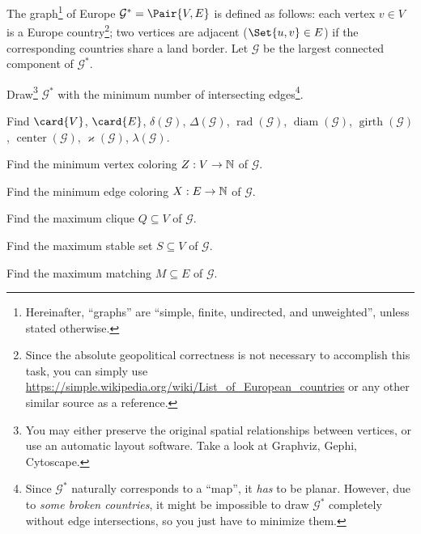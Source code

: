\documentclass[a4paper,12pt]{article}
\newcommand{\MyGraph}{\mathcal{G}}
\newcommand{\MyGraphFull}{\MyGraph^{*}}
\newcommand{\op}[1]{\operatorname*{#1}}
\newcommand{\minDegree}[1]{\delta(#1)}
\newcommand{\maxDegree}[1]{\Delta(#1)}
\newcommand{\graphRadius}[1]{\op{rad}(#1)}
\newcommand{\graphDiameter}[1]{\op{diam}(#1)}
\newcommand{\graphGirth}[1]{\op{girth}(#1)}
\newcommand{\graphCenter}[1]{\op{center}(#1)}
\newcommand{\vertexConnectivity}[1]{\varkappa(#1)}
\newcommand{\edgeConnectivity}[1]{\lambda(#1)}
\begin{document}

\begin{tasks}
    \item The graph\footnote{Hereinafter, \enquote{graphs} are \enquote{simple, finite, undirected, and unweighted}, unless stated otherwise.} of Europe $\MyGraphFull = \Pair{V, E}$ is defined as follows: each vertex $v \in V$ is a Europe country\footnote{Since the absolute geopolitical correctness is not necessary to accomplish this task, you can simply use \url{https://simple.wikipedia.org/wiki/List_of_European_countries} or any other similar source as a reference.}; two vertices are adjacent ($\Set{u,v} \in E$) if the corresponding countries share a land border.
    Let $\MyGraph$ be the largest connected component of $\MyGraphFull$.

    \begin{subtasks}
        \item Draw\footnote{You may either preserve the original spatial relationships between vertices, or use an automatic layout software. Take a look at Graphviz, Gephi, Cytoscape.} $\MyGraphFull$ with the minimum number of intersecting edges\footnote{Since $\MyGraphFull$ naturally corresponds to a \enquote{map}, it \emph{has} to be planar. However, due to \emph{some broken countries}, it might be impossible to draw $\MyGraphFull$ completely without edge intersections, so you just have to minimize them.}.

        \item Find $\card{V}$, $\card{E}$, $\minDegree{\MyGraph}$, $\maxDegree{\MyGraph}$, $\graphRadius{\MyGraph}$, $\graphDiameter{\MyGraph}$, $\graphGirth{\MyGraph}$, $\graphCenter{\MyGraph}$, $\vertexConnectivity{\MyGraph}$, $\edgeConnectivity{\MyGraph}$.

        \item Find the minimum vertex coloring $Z : V \to \mathbb{N}$ of $\MyGraph$.

        \item Find the minimum edge coloring $X : E \to \mathbb{N}$ of $\MyGraph$.

        \item Find the maximum clique $Q \subseteq V$ of $\MyGraph$.

        \item Find the maximum stable set $S \subseteq V$ of $\MyGraph$.

        \item Find the maximum matching $M \subseteq E$ of $\MyGraph$.


\end{subtasks}
\end{tasks}
\end{document}
